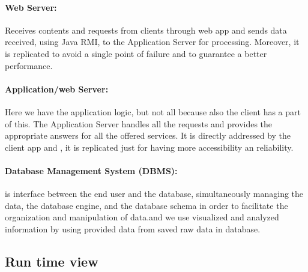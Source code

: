 \paragraph{Web Server:} Receives contents and requests from clients through web app and sends data received, using Java RMI, to the Application Server for processing. Moreover, it is replicated to avoid a single point of failure and to guarantee a better performance.
\paragraph{Application/web Server:}Here we have the application logic, but not all because also the client has a part of this. The Application Server handles all the requests and provides the appropriate answers for all the offered services. It is directly addressed by the client app and , it is replicated just for having more accessibility an reliability.
\paragraph{Database Management System (DBMS):} is interface between the end user and the database, simultaneously managing the data, the database engine, and the database schema in order to facilitate the organization and manipulation of data.and we use  visualized and analyzed information by using  provided data from saved raw data in database.


\subsection{Run time view}
